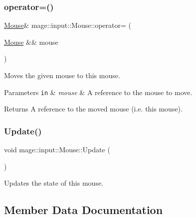\subsubsection{\texorpdfstring{operator=()}{operator=()}\hspace{0.1cm}{\footnotesize\ttfamily [2/2]}}
{\footnotesize\ttfamily \mbox{\hyperlink{classmage_1_1input_1_1_mouse}{Mouse}}\& mage\+::input\+::\+Mouse\+::operator= (\begin{DoxyParamCaption}\item[{\mbox{\hyperlink{classmage_1_1input_1_1_mouse}{Mouse}} \&\&}]{mouse }\end{DoxyParamCaption})\hspace{0.3cm}{\ttfamily [delete]}}

Moves the given mouse to this mouse.


\begin{DoxyParams}[1]{Parameters}
\mbox{\tt in}  & {\em mouse} & A reference to the mouse to move. \\
\hline
\end{DoxyParams}
\begin{DoxyReturn}{Returns}
A reference to the moved mouse (i.\+e. this mouse). 
\end{DoxyReturn}
\mbox{\label{classmage_1_1input_1_1_mouse_aa4eb9865206c2b946f8d21106d378907}} 
\subsubsection{\texorpdfstring{Update()}{Update()}}
{\footnotesize\ttfamily void mage\+::input\+::\+Mouse\+::\+Update (\begin{DoxyParamCaption}{ }\end{DoxyParamCaption})\hspace{0.3cm}{\ttfamily [noexcept]}}

Updates the state of this mouse. 

\subsection{Member Data Documentation}
\mbox{\label{classmage_1_1input_1_1_mouse_a7a11cd8de9e8dda4ef40c31670b04b00}} 
